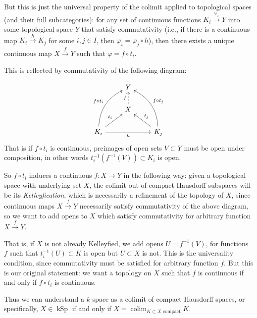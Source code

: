 \documentclass[12pt,a4paper]{article}
\DeclareMathOperator{\colim}{colim}
\DeclareMathOperator{\kSp}{kSp}
\begin{document}
But this is just the universal property of the colimit applied to topological spaces (and their full subcategories): for any set of continuous functions  $K_i \stackrel{\varphi_i}{\to}Y$ into some topological space $Y$ that satisfy commutativity (i.e., if there is a continuous map $K_i \stackrel{h}{\to} K_j $ for some $i, j \in I$, then $\varphi_i = \varphi_j \circ h$), then there exists a unique continuous map $X \stackrel{f}{\to}Y$ such that $\varphi = f \circ t_i$. 

This is reflected by commutativity of the following diagram:

\[\begin{tikzcd}
	& Y \\
	& X \\
	{K_i} && {K_j}
	\arrow["f", dashed, from=2-2, to=1-2]
	\arrow["{f \circ t_i}", bend left,  from=3-1, to=1-2]
	\arrow["{t_i}", from=3-1, to=2-2]
	\arrow["h"', from=3-1, to=3-3]
	\arrow["{f \circ t_j}"', bend right, from=3-3,  to=1-2]
	\arrow["{t_j}"', from=3-3, to=2-2]
\end{tikzcd}\]
That is if $f \circ t_i$ is continuous, preimages of open sets $V \subset Y$ must be open under composition, in other words $t_i^{-1}(f^{-1}(V)) \subset K_i$ is open. 

So $f \circ t_i$ induces a continuous $f: X \to Y$ in the following way: given a topological space with underlying set  $X$, the colimit out of compact Hausdorff subspaces will be its \emph{Kelleyfication}, which is necessarily a refinement of the topology of $X$, since continuous maps $X \stackrel{f}{\to}Y$ necessarily satisfy commutativity of the above diagram, so we want to add opens to $X$ which satisfy commutativity for arbitrary function $X \stackrel{f}{\to}Y$. 



That is, if $X$ is not already Kelleyfied, we add opens $U = f^{-1}(V)$, for functions $f$ such that  $t_i^{-1}(U) \subset K$ is open  but $U \subset X$ is not. This is the universality condition, since commutativity must be satisfied for arbitrary function $f$. But this is our original statement: we want a topology on $X$ such that $f$ is continuous if and only if $f \circ t_i$ is continuous. 

Thus we can understand a $k$-space as a colimit of compact Hausdorff spaces, or specifically, $X \in \kSp$ if and only if $X = \colim_{K \subset X \text{ compact}}K$.
\end{document}
